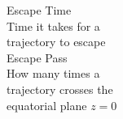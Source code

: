 \documentclass[preview]{standalone}
\begin{document}
Escape Time\\Time it takes for a\\trajectory to escape\\Escape Pass\\How many times a\\trajectory crosses the\\equatorial plane $z=0$\\
\end{document}
